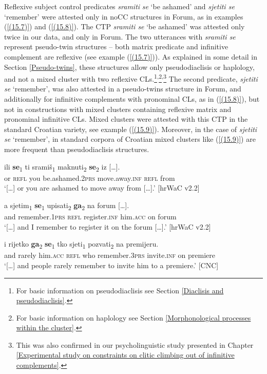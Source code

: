\noindent Reflexive subject control predicates \textit{sramiti} \textit{se} ‘be ashamed’ and \textit{sjetiti se} ‘remember’ were attested only in noCC structures in Forum, as in examples (\ref{(15.7)}) and (\ref{(15.8)}). The CTP \textit{sramiti se} ‘be ashamed’ was attested only twice in our data, and only in Forum. The two utterances with \textit{sramiti se} represent pseudo-twin structures – both matrix predicate and infinitive complement are reflexive (see example (\ref{(15.7)})). As explained in some detail in Section \ref{Pseudo-twins}, these structures allow only pseudodiaclisis or haplology, and not a mixed cluster with two reflexive CLs.\footnote{For basic information on pseudodiaclisis see Section \ref{Diaclisis and pseudodiaclisis}.}\textsuperscript{,}\footnote{For basic information on haplology see Section \ref{Morphonological processes within the cluster}.}\textsuperscript{,}\footnote{This was also confirmed in our psycholinguistic study presented in Chapter \ref{Experimental study on constraints on clitic climbing out of infinitive complements}.} The second predicate, \textit{sjetiti se} ‘remember’, was also attested in a pseudo-twins structure in Forum, and additionally for infinitive complements with pronominal CLs, as in (\ref{(15.8)}), but not in constructions with mixed clusters containing reflexive matrix and pronominal infinitive CLs. Mixed clusters were attested with this CTP in the standard Croatian variety, see example (\ref{(15.9)}). Moreover, in the case of \textit{sjetiti se} ‘remember’, in standard corpora of Croatian mixed clusters like (\ref{(15.9)}) are more frequent than pseudodiaclisis structures.

\begin{exe}\ex\label{(15.7)}
\gll [\dots] ili \textbf{se}\textsubscript{1} ti sramiš\textsubscript{1} maknuti\textsubscript{2} \textbf{se}\textsubscript{2} {iz  [\dots].} \\
{} or \textsc{refl} you be.ashamed.2\textsc{prs} move.away.\textsc{inf} \textsc{refl} from  \\
\glt ‘[\dots] or you are ashamed to move away from [\dots].’
\hfill [hrWaC v2.2]

\ex\label{(15.8)}
\gll [\dots] a sjetim\textsubscript{1} \textbf{se}\textsubscript{1} upisati\textsubscript{2} \textbf{ga}\textsubscript{2} na {forum  [\dots].}\\
{} and remember.1\textsc{prs} \textsc{refl} register.\textsc{inf} him.\textsc{acc} on forum\\
\glt ‘[\dots] and I remember to register it on the forum [\dots].’
\hfill [hrWaC v2.2]

\ex\label{(15.9)}
\gll [\dots] i rijetko \textbf{ga}\textsubscript{2} \textbf{se}\textsubscript{1} tko sjeti\textsubscript{1} pozvati\textsubscript{2}  na  premijeru. \\
 {} and rarely him.\textsc{acc} \textsc{refl} who remember.3\textsc{prs} invite.\textsc{inf} on premiere \\
\glt ‘[\dots] and people rarely remember to invite him to a premiere.’
\hfill [CNC]
\end{exe}

